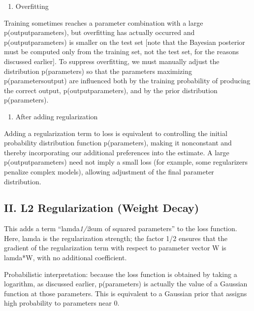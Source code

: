 \begin{enumerate}
\def\labelenumi{(\arabic{enumi})}
\setcounter{enumi}{3}
\tightlist
\item
  Overfitting
\end{enumerate}

Training sometimes reaches a parameter combination with a large p(output\textbar parameters), but overfitting has actually occurred and p(output\textbar parameters) is smaller on the test set {[}note that the Bayesian posterior must be computed only from the training set, not the test set, for the reasons discussed earlier{]}. To suppress overfitting, we must manually adjust the distribution p(parameters) so that the parameters maximizing p(parameters\textbar output) are influenced both by the training probability of producing the correct output, p(output\textbar parameters), and by the prior distribution p(parameters).

\begin{enumerate}
\def\labelenumi{(\arabic{enumi})}
\setcounter{enumi}{4}
\tightlist
\item
  After adding regularization
\end{enumerate}

Adding a regularization term to loss is equivalent to controlling the initial probability distribution function p(parameters), making it nonconstant and thereby incorporating our additional preferences into the estimate. A large p(output\textbar parameters) need not imply a small loss (for example, some regularizers penalize complex models), allowing adjustment of the final parameter distribution.

\hypertarget{ii.-l2-regularization-weight-decay}{%
\subsection{II. L2 Regularization (Weight Decay)}\label{ii.-l2-regularization-weight-decay}}

This adds a term ``lamda\emph{1/2}sum of squared parameters'' to the loss function. Here, lamda is the regularization strength; the factor 1/2 ensures that the gradient of the regularization term with respect to parameter vector W is lamda*W, with no additional coefficient.

Probabilistic interpretation: because the loss function is obtained by taking a logarithm, as discussed earlier, p(parameters) is actually the value of a Gaussian function at those parameters. This is equivalent to a Gaussian prior that assigns high probability to parameters near 0.

